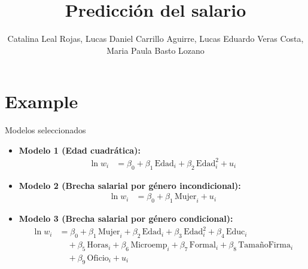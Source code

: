 \documentclass[11pt]{beamer}
\author[Grupo 3]{Catalina Leal Rojas, Lucas Daniel Carrillo Aguirre, Lucas Eduardo Veras Costa, Maria Paula Basto Lozano}
\title[Sección 5]{Predicción del salario}
\begin{document}
\begin{frame}
\titlepage
\end{frame}

\section{Example}

\begin{frame}{Modelos seleccionados}
\begin{itemize}

\item \textbf{Modelo 1 (Edad cuadrática):}
{\small
\[
\begin{aligned}
\ln w_{i} &= \beta_{0} 
+ \beta_{1}\,\text{Edad}_{i}
+ \beta_{2}\,\text{Edad}_{i}^{2}
+ u_{i}
\end{aligned}
\]
}

\item \textbf{Modelo 2 (Brecha salarial por género incondicional):}
{\small
\[
\begin{aligned}
\ln w_{i} &= \beta_{0} 
+ \beta_{1}\,\text{Mujer}_{i}
+ u_{i}
\end{aligned}
\]
}

\item \textbf{Modelo 3 (Brecha salarial por género condicional):}
{\small
\[
\begin{aligned}
\ln w_{i} &= \beta_{0} 
+ \beta_{1}\,\text{Mujer}_{i}
+ \beta_{2}\,\text{Edad}_{i}
+ \beta_{3}\,\text{Edad}_{i}^{2}
+ \beta_{4}\,\text{Educ}_{i}
\\&\quad
+ \beta_{5}\,\text{Horas}_{i}
+ \beta_{6}\,\text{Microemp}_{i}
+ \beta_{7}\,\text{Formal}_{i}
+ \beta_{8}\,\text{TamañoFirma}_{i}
\\&\quad
+ \beta_{9}\,\text{Oficio}_{i}
+ u_{i}
\end{aligned}
\]
}
\end{itemize}


\end{frame}
\end{document}
